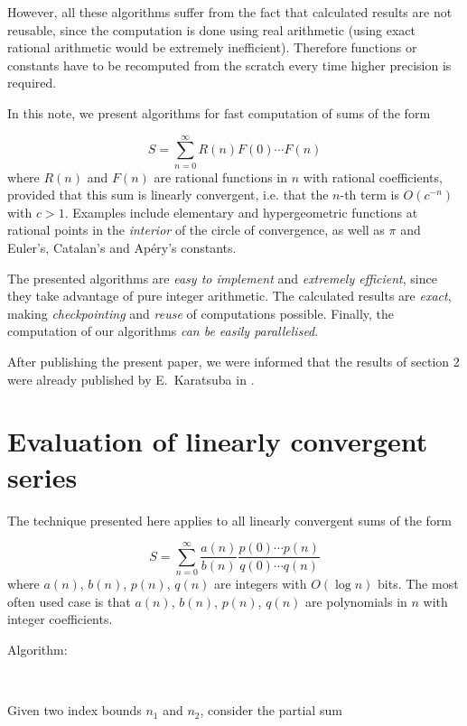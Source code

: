 However, all these algorithms suffer from the fact that calculated results
are not reusable, since the computation is done using real arithmetic (using
exact rational arithmetic would be extremely inefficient). Therefore functions
or constants have to be recomputed from the scratch every time higher precision
is required.

In this note, we present algorithms for fast computation of sums of the form

\[S=\sum _{n=0}^{\infty }R(n)F(0)\cdots F(n)\]
where \( R(n) \) and \( F(n) \) are rational functions in \( n \) with rational
coefficients, provided that this sum is linearly convergent, i.e. that the
\( n \)-th term is \( O(c^{-n}) \) with  \( c>1 \). Examples include elementary
and hypergeometric functions at rational points in the {\em interior} of the
circle of convergence, as well as \( \pi  \) and Euler's, Catalan's and
Ap{\'e}ry's constants.

The presented algorithms are {\em easy to implement} and {\em extremely
efficient}, since they take advantage of pure integer arithmetic. The
calculated results are {\em exact}, making {\em checkpointing} and
{\em reuse} of computations possible. Finally,
the computation of our algorithms {\em can be easily parallelised}.

After publishing the present paper, we were informed that the results of
section 2 were already published by E.~Karatsuba in \cite{91,91b,93,95c}.

\section{Evaluation of linearly convergent series}

The technique presented here applies to all linearly convergent sums of the
form

\[ S=\sum ^{\infty }_{n=0}
\frac{a(n)}{b(n)}\frac{p(0)\cdots p(n)}{q(0)\cdots q(n)}\]
where  \( a(n) \),  \( b(n) \),  \( p(n) \),  \( q(n) \) are integers with
\( O(\log n) \) bits. The most often used case is that  \( a(n) \), \( b(n) \),
\( p(n) \),  \( q(n) \) are polynomials in  \( n \) with integer coefficients.

\begin{description}
\item [Algorithm:]~
\end{description}

Given two index bounds  \( n_{1} \) and  \( n_{2} \), consider the partial sum 


